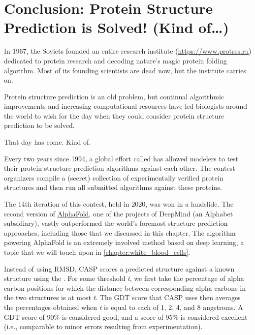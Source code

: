 \FloatBarrier
{}

\section{Conclusion: Protein Structure Prediction is Solved! (Kind of\ldots)}
\label{sec:conclusion_part_1}

In 1967, the Soviets founded an entire research institute (\url{https://www.protres.ru}) dedicated to protein research and decoding nature's magic protein folding algorithm. Most of its founding scientists are dead now, but the institute carries on.

Protein structure prediction is an old problem, but continual algorithmic improvements and increasing computational resources have led biologists around the world to wish for the day when they could consider protein structure prediction to be solved.

That day has come. Kind of.

Every two years since 1994, a global effort called  has allowed modelers to test their protein structure prediction algorithms against each other. The contest organizers compile a (secret) collection of experimentally verified protein structures and then run all submitted algorithms against these proteins.

The 14th iteration of this contest, held in 2020, was won in a landslide. The second version of \href{https://bit.ly/3sKl6pH}{AlphaFold}, one of the projects of DeepMind (an Alphabet subsidiary), vastly outperformed the world's foremost structure prediction approaches, including those that we discussed in this chapter. The algorithm powering AlphaFold is an extremely involved method based on deep learning, a topic that we will touch upon in \autoref{chapter:white_blood_cells}.

Instead of using RMSD, CASP scores a predicted structure against a known structure using the . For some threshold \textit{t}, we first take the percentage of alpha carbon positions for which the distance between corresponding alpha carbons in the two structures is at most \textit{t}. The GDT score that CASP uses then averages the percentages obtained when \textit{t} is equal to each of 1, 2, 4, and 8 angstroms. A GDT score of 90\% is considered good, and a score of 95\% is considered excellent (i.e., comparable to minor errors resulting from experimentation).

